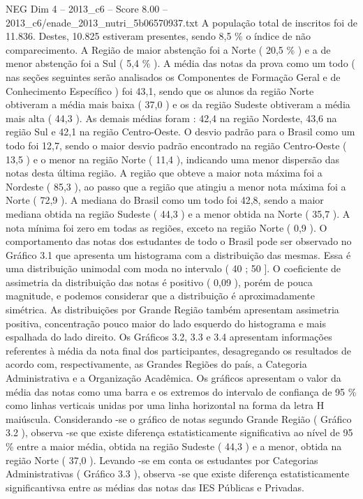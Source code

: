 \begin{textsample}{NEG Dim 4 – 2013\_c6 – Score 8.00 – 2013\_c6/enade\_2013\_nutri\_5b06570937.txt}
A população total de inscritos foi de 11.836.
Destes, 10.825 estiveram presentes, sendo 8,5 \% o índice de não comparecimento.
A Região de maior abstenção foi a Norte ( 20,5 \% ) e a de menor abstenção foi a Sul ( 5,4 \% ).
A média das notas da prova como um todo ( nas seções seguintes serão analisados os Componentes de Formação Geral e de Conhecimento Específico ) foi 43,1, sendo que os alunos da região Norte obtiveram a média mais baixa ( 37,0 ) e os da região Sudeste obtiveram a média mais alta ( 44,3 ).
As demais médias foram : 42,4 na região Nordeste, 43,6 na região Sul e 42,1 na região Centro-Oeste.
O desvio padrão para o Brasil como um todo foi 12,7, sendo o maior desvio padrão encontrado na região Centro-Oeste ( 13,5 ) e o menor na região Norte ( 11,4 ), indicando uma menor dispersão das notas desta última região.
A região que obteve a maior nota máxima foi a Nordeste ( 85,3 ), ao passo que a região que atingiu a menor nota máxima foi a Norte ( 72,9 ).
A mediana do Brasil como um todo foi 42,8, sendo a maior mediana obtida na região Sudeste ( 44,3 ) e a menor obtida na Norte ( 35,7 ).
A nota mínima foi zero em todas as regiões, exceto na região Norte ( 0,9 ).
O comportamento das notas dos estudantes de todo o Brasil pode ser observado no Gráfico 3.1 que apresenta um histograma com a distribuição das mesmas.
Essa é uma distribuição unimodal com moda no intervalo ( 40 ; 50 ].
O coeficiente de assimetria da distribuição das notas é positivo ( 0,09 ), porém de pouca magnitude, e podemos considerar que a distribuição é aproximadamente simétrica.
As distribuições por Grande Região também apresentam assimetria positiva, concentração pouco maior do lado esquerdo do histograma e mais espalhada do lado direito.
Os Gráficos 3.2, 3.3 e 3.4 apresentam informações referentes à média da nota final dos participantes, desagregando os resultados de acordo com, respectivamente, as Grandes Regiões do país, a Categoria Administrativa e a Organização Acadêmica.
Os gráficos apresentam o valor da média das notas como uma barra e os extremos do intervalo de confiança de 95 \% como linhas verticais unidas por uma linha horizontal na forma da letra H maiúscula.
Considerando -se o gráfico de notas segundo Grande Região ( Gráfico 3.2 ), observa -se que existe diferença estatisticamente significativa ao nível de 95 \% entre a maior média, obtida na região Sudeste ( 44,3 ) e a menor, obtida na região Norte ( 37,0 ).
Levando -se em conta os estudantes por Categorias Administrativas ( Gráfico 3.3 ), observa -se que existe diferença estatisticamente significantivsa entre as médias das notas das IES Públicas e Privadas.

\end{textsample}
